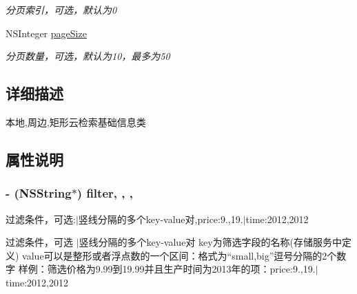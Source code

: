 \begin{DoxyCompactItemize}
\begin{DoxyCompactList}\small\item\em 分页索引，可选，默认为0 \end{DoxyCompactList}\item 
\hypertarget{interface_b_m_k_cloud_search_info_ab625992f8620205a6b24a1490a999fde}{}N\+S\+Integer \hyperlink{interface_b_m_k_cloud_search_info_ab625992f8620205a6b24a1490a999fde}{page\+Size}\label{interface_b_m_k_cloud_search_info_ab625992f8620205a6b24a1490a999fde}

\begin{DoxyCompactList}\small\item\em 分页数量，可选，默认为10，最多为50 \end{DoxyCompactList}\end{DoxyCompactItemize}


\subsection{详细描述}
本地,周边,矩形云检索基础信息类 

\subsection{属性说明}
\hypertarget{interface_b_m_k_cloud_search_info_a65d91501d19f2a6aa027de6f9e5bc837}{}
\subsubsection[{filter}]{\setlength{\rightskip}{0pt plus 5cm}-\/ (N\+S\+String$\ast$) filter\hspace{0.3cm}{\ttfamily [read]}, {\ttfamily [write]}, {\ttfamily [nonatomic]}, {\ttfamily [strong]}}\label{interface_b_m_k_cloud_search_info_a65d91501d19f2a6aa027de6f9e5bc837}


过滤条件，可选\+:\textquotesingle{}$\vert$\textquotesingle{}竖线分隔的多个key-\/value对,price\+:9.,19.$\vert$time\+:2012,2012 

过滤条件，可选 \textquotesingle{}$\vert$\textquotesingle{}竖线分隔的多个key-\/value对 key为筛选字段的名称(存储服务中定义) value可以是整形或者浮点数的一个区间：格式为“small,big”逗号分隔的2个数字 样例：筛选价格为9.99到19.99并且生产时间为2013年的项：price\+:9.,19.$\vert$time\+:2012,2012 \hypertarget{interface_b_m_k_cloud_search_info_ab0d42d1b9e841c5e538e457e819a07f7}{}
